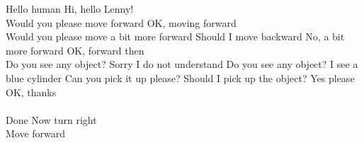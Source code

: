\begin{Transcript}[p]
\begin{dialogue} \vspace{3mm}
 Hello human\vspace{2mm}
 Hi, hello Lenny! \vspace{1mm} \\ 
 \vspace{2mm}
 Would you please move forward\vspace{2mm}
 OK, moving forward  \vspace{1mm} \\
 \vspace{2mm}
 Would you please move a bit more forward\vspace{2mm}
 Should I move backward \vspace{2mm}
 No, a bit more forward\vspace{2mm}
 OK, forward then \vspace{1mm} \\ 
 \vspace{2mm}
 Do you see any object?\vspace{2mm}
 Sorry I do not understand\vspace{2mm}
 Do you see any object?\vspace{2mm}
 I see a blue cylinder\vspace{2mm}
 Can you pick it up please?\vspace{2mm}
 Should I pick up the object?\vspace{2mm}
 Yes please\vspace{2mm}
 OK, thanks  \vspace{1mm} \\
 \\
 \vspace{2mm}
 Done\vspace{2mm}
 Now turn right \vspace{1mm} \\ 
 \vspace{2mm}
 Move forward \vspace{1mm} \\ 

\end{dialogue}
\end{Transcript}
